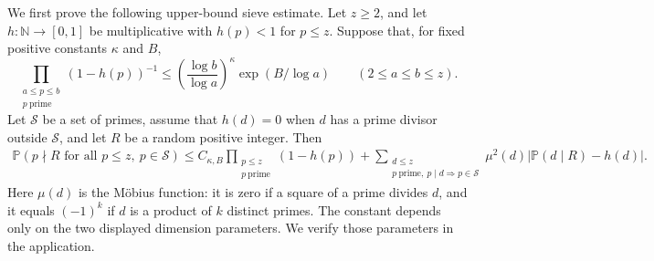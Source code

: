 \documentclass[twoside]{aomart}
\theoremstyle{paperplain}
\theoremstyle{paperdefinition}
\newcommand{\N}{\mathbb N}
\numberwithin{equation}{section}
\begin{document}
We first prove the following upper-bound sieve estimate.
Let $z\ge2$, and let
$h:\N\to[0,1]$ be multiplicative with $h(p)<1$ for $p\le z$.
Suppose that, for fixed positive constants $\kappa$ and $B$,
\begin{equation}
 \prod_{\substack{a\le p\le b\\p\ \mathrm{prime}}}(1-h(p))^{-1}
 \le\left(\frac{\log b}{\log a}\right)^\kappa
       \exp(B/\log a)
 \qquad(2\le a\le b\le z).
 \label{sc:sieve-dimension}
\end{equation}
Let $\mathcal S$ be a set of primes, assume that $h(d)=0$ when
$d$ has a prime divisor outside $\mathcal S$, and let $R$ be a
random positive integer. Then
\begin{align}
 \mathbb P\left(p\nmid R\text{ for all }p\le z,
                                      \ p\in\mathcal S\right)
 \le C_{\kappa,B}\prod_{\substack{p\le z\\p\ \mathrm{prime}}}(1-h(p))
  +\sum_{\substack{d\le z\\p\ \mathrm{prime},\ p\mid d\Rightarrow p\in\mathcal S}}
        \mu^2(d)\left|\mathbb P(d\mid R)-h(d)\right|.
 \label{sc:bsz-upper-sieve}
\end{align}
Here $\mu(d)$ is the M\"obius function: it is zero if a square of
a prime divides $d$, and it equals $(-1)^k$ if $d$ is a product of
$k$ distinct primes. The constant depends only on the two displayed
dimension parameters. We verify those parameters in the application.
\end{document}
